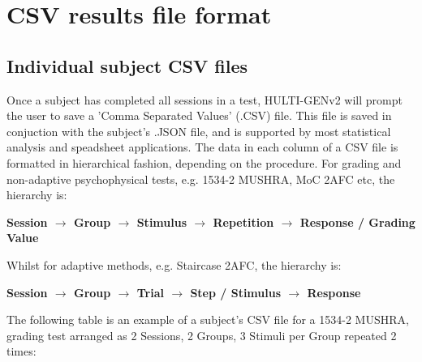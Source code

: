 \chapter{CSV results file format}

\section{Individual subject CSV files}

Once a subject has completed all sessions in a test, HULTI-GENv2 will prompt the user to save a 'Comma Separated Values' (.CSV) file. This file is saved in conjuction with the subject's .JSON file, and is supported by most statistical analysis and speadsheet applications. The data in each column of a CSV file is formatted in hierarchical fashion, depending on the procedure. For grading and non-adaptive psychophysical tests, e.g. 1534-2 MUSHRA, MoC 2AFC etc, the hierarchy is:

\begin{center}
	\textbf{Session $\rightarrow$ Group $\rightarrow$ Stimulus $\rightarrow$ Repetition $\rightarrow$ Response / Grading Value}
\end{center}
\noindent
Whilst for adaptive methods, e.g. Staircase 2AFC, the hierarchy is:

\begin{center}
	\textbf{Session $\rightarrow$ Group $\rightarrow$ Trial $\rightarrow$ Step / Stimulus $\rightarrow$ Response}
\end{center}
\pagebreak
The following table is an example of a subject's CSV file for a 1534-2 MUSHRA, grading test arranged as 2 Sessions, 2 Groups, 3 Stimuli per Group repeated 2 times:

